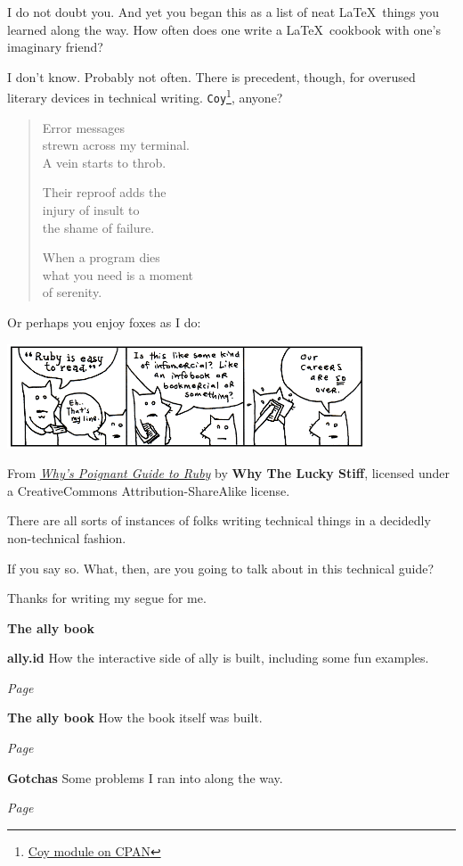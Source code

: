 \begin{paracol}{2}
\begin{leftcolumn}
\begin{ally}
  I do not doubt you. And yet you began this as a list of neat \LaTeX\ things you learned along the way. How often does one write a \LaTeX\ cookbook with one's imaginary friend?
\end{ally}
I don't know. Probably not often. There is precedent, though, for overused literary devices in technical writing. \texttt{Coy}\footnote{\href{https://metacpan.org/pod/Coy}{Coy module on CPAN}}, anyone? 

\begin{verse}
  Error messages\\
  strewn across my terminal.\\
  A vein starts to throb. 
   
  Their reproof adds the\\
  injury of insult to\\
  the shame of failure. 
   
  When a program dies\\
  what you need is a moment\\
  of serenity. 
\end{verse}

Or perhaps you enjoy foxes as I do:

\noindent\includegraphics[width=4.2in]{assets/the.foxes-3.png}
\begin{center}
  \footnotesize
  From \href{https://poignant.guide}{\emph{Why's Poignant Guide to Ruby}} by \textbf{Why The Lucky Stiff}, licensed under a CreativeCommons Attribution-ShareAlike license.
\end{center}

There are all sorts of instances of folks writing technical things in a decidedly non-technical fashion.

\begin{ally}
  If you say so. What, then, are you going to talk about in this technical guide?
\end{ally}
Thanks for writing my segue for me.

\begin{labeling}{\textbf{The ally book}}
  \item[\textbf{ally.id}] How the interactive side of ally is built, including some fun examples.

  \emph{Page \pageref{site}}
  \item[\textbf{The ally book}] How the book itself was built.

  \emph{Page \pageref{book}}
  \item[\textbf{Gotchas}] Some problems I ran into along the way.

  \emph{Page \pageref{gotchas}}
\end{labeling}

\end{leftcolumn}
\end{paracol}
